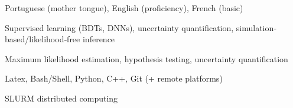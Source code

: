 
\begin{cvskills}

{Portuguese (mother tongue), English (proficiency), French (basic)}

{Supervised learning (BDTs, DNNs), uncertainty quantification, simulation‐based/likelihood‐free inference}

{Maximum likelihood estimation, hypothesis testing, uncertainty quantification}

{Latex, Bash/Shell, Python, C++, Git (+ remote platforms)}


{SLURM distributed computing}

\end{cvskills}